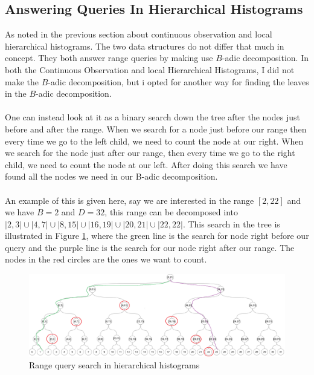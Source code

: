 \documentclass[11pt]{article}
\theoremstyle{definition}
\begin{document}
\subsection{Answering Queries In Hierarchical Histograms}\label{decom}
As noted in the previous section about continuous observation and local hierarchical histograms. The two data structures do not differ that much in concept. They both answer range queries by making use $B$-adic decomposition. In both the Continuous Observation and local Hierarchical Histograms, I did not make the $B$-adic decomposition, but i opted for another way for finding the leaves in the $B$-adic decomposition. \\ \\
One can instead look at it as a binary search down the tree after the nodes just before and after the range. When we search for a node just before our range then every time we go to the left child, we need to count the node at our right. When we search for the node just after our range, then every time we go to the right child, we need to count the node at our left. After doing this search we have found all the nodes we need in our B-adic decomposition.\\ \\
An example of this is given here, say we are interested in the range $[2,22]$ and we have $B=2$ and $D=32$, this range can be decomposed into $|2,3| \cup|4,7| \cup|8,15| \cup|16,19| \cup|20,21| \cup|22,22|$. This search in the tree is illustrated in Figure \ref{fig:disjoint_se_1}, where the green line is the search for node right before our query and the purple line is the search for our node right after our range. The nodes in the red circles are the ones we want to count. 
\begin{figure}[H]
    \centering
    \includegraphics[width=.8\linewidth]{figures/disjoint_search_1.png}
    \caption{Range query search in hierarchical histograms}
    \label{fig:disjoint_se_1}
\end{figure}
\end{document}
